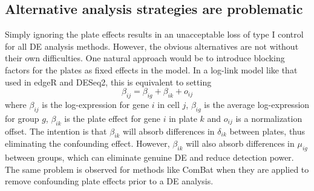 \documentclass[oupdraft]{bio}
\begin{document}
\subsection{Alternative analysis strategies are problematic}
Simply ignoring the plate effects results in an unacceptable loss of type I control for all DE analysis methods.
However, the obvious alternatives are not without their own difficulties.
One natural approach would be to introduce blocking factors for the plates as fixed effects in the model.
In a log-link model like that used in edgeR and DESeq2, this is equivalent to setting
\[
    \beta_{ij} = \beta_{ig} + \beta_{ik} + o_{ij}
\]
where $\beta_{ij}$ is the log-expression for gene $i$ in cell $j$, $\beta_{ig}$ is the average log-expression for group $g$, 
    $\beta_{ik}$ is the plate effect for gene $i$ in plate $k$ and $o_{ij}$ is a normalization offset.
The intention is that $\beta_{ik}$ will absorb differences in $\delta_{ik}$ between plates, thus eliminating the confounding effect.
However, $\beta_{ik}$ will also absorb differences in $\mu_{ig}$ between groups, which can eliminate genuine DE and reduce detection power.
The same problem is observed for methods like ComBat \citep{johnson2007adjusting} when they are applied to remove confounding plate effects prior to a DE analysis.
\end{document}
